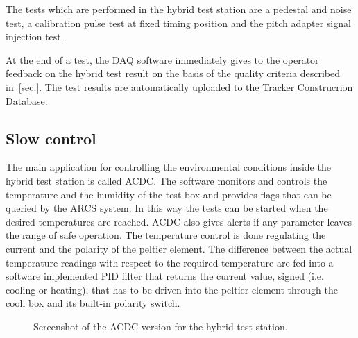 The tests which are performed in the hybrid test station are a pedestal and noise test, a calibration pulse test at fixed timing position and the pitch adapter signal injection test.

At the end of a test, the DAQ software immediately gives to the operator feedback on the hybrid test result on the basis of the quality criteria described in~\ref{sec:}. The test results are automatically uploaded to the Tracker Construcrion Database.

\subsection{Slow control}
\label{sec:slowcontrol}
\label{sec:acdc}

The main application for controlling the environmental conditions inside the hybrid test station is called ACDC. 
The software monitors and controls the temperature and the humidity of the test box and provides flags that can be queried by the ARCS system.
In this way the tests can be started when the desired temperatures are reached.
ACDC also gives alerts if any parameter leaves the range of safe operation. 
The temperature control is done regulating the current and the polarity of the peltier element. 
The difference between the actual temperature readings with respect to the required temperature are fed into a software implemented PID filter that returns the current value, signed (i.e. cooling or heating), that has to be driven into the peltier element through the cooli box and its built-in polarity switch.
\begin{figure}[h]
  \begin{center}
    \caption{Screenshot of the ACDC version for the hybrid test station.}
    \label{fig:ss_acdc_teststation}
  \end{center}
\end{figure}
